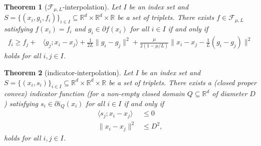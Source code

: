 \documentclass[11pt,a4paper]{article}
\newtheorem{theorem}{Theorem}
\begin{document}
	\begin{theorem}[$\mathcal{F}_{\mu,L}$-interpolation]\label{thm:interp_smoothstronglyconvex} Let $I$ be an index set and $S=\{(x_i,g_i,f_i)\}_{i\in I}\subseteq \mathbb{R}^d\times\mathbb{R}^d\times \mathbb{R}$ be a set of triplets. There exists $f\in\mathcal{F}_{\mu,L}$ satisfying $f(x_i)=f_i$ and $g_i\in\partial f(x_i)$ for all $i\in I$ if and only if
\begin{equation*}
\begin{aligned}
f_i\geqslant f_j+&\langle g_j;x_i-x_j\rangle+\frac{1}{2L}\|g_i-g_j\|^2+\frac{\mu}{2(1-\mu/L)}\|x_i-x_j-\tfrac{1}{L}(g_i-g_j)\|^2
\end{aligned}
\end{equation*}
holds for all $i,j\in I$.
\end{theorem}

\begin{theorem}[indicator-interpolation]\label{thm:interp_indicator} Let $I$ be an index set and $S=\{(x_i,s_i)\}_{i\in I}\subseteq \mathbb{R}^d\times\mathbb{R}^d\times \mathbb{R}$ be a set of triplets. There exists a (closed proper convex) indicator function (for a non-empty closed domain $Q\subseteq\mathbb{R}^d$ of diameter $D$) satisfying  $s_i\in\partial i_Q(x_i)$ for all $i\in I$ if and only if
\begin{equation*}
\begin{aligned}
\langle s_j;x_i-x_j\rangle&\leqslant 0\\
 \|x_i-x_j\|^2 &\leqslant D^2,
\end{aligned}
\end{equation*}
holds for all $i,j\in I$.
\end{theorem}
\end{document}
